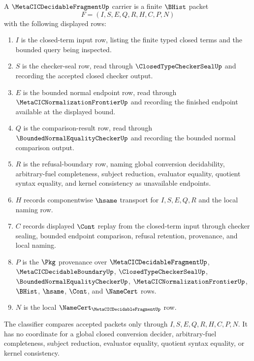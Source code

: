 \begin{definition}
\label{def:metacic-decidable-fragment-carrier}
A $\MetaCICDecidableFragmentUp$ carrier is a finite $\BHist$ packet
$$
F=(I,S,E,Q,R,H,C,P,N)
$$
with the following displayed rows:
\begin{enumerate}
\item $I$ is the closed-term input row, listing the finite typed closed terms and the bounded query being inspected.
\item $S$ is the checker-seal row, read through $\ClosedTypeCheckerSealUp$ and recording the accepted closed checker output.
\item $E$ is the bounded normal endpoint row, read through $\MetaCICNormalizationFrontierUp$ and recording the finished endpoint available at the displayed bound.
\item $Q$ is the comparison-result row, read through $\BoundedNormalEqualityCheckerUp$ and recording the bounded normal comparison output.
\item $R$ is the refusal-boundary row, naming global conversion decidability, arbitrary-fuel completeness, subject reduction, evaluator equality, quotient syntax equality, and kernel consistency as unavailable endpoints.
\item $H$ records componentwise $\hsame$ transport for $I,S,E,Q,R$ and the local naming row.
\item $C$ records displayed $\Cont$ replay from the closed-term input through checker sealing, bounded endpoint comparison, refusal retention, provenance, and local naming.
\item $P$ is the $\Pkg$ provenance over $\MetaCICDecidableFragmentUp$, $\MetaCICDecidableBoundaryUp$, $\ClosedTypeCheckerSealUp$, $\BoundedNormalEqualityCheckerUp$, $\MetaCICNormalizationFrontierUp$, $\BHist$, $\hsame$, $\Cont$, and $\NameCert$ rows.
\item $N$ is the local $\NameCert_{\MetaCICDecidableFragmentUp}$ row.
\end{enumerate}
The classifier compares accepted packets only through $I,S,E,Q,R,H,C,P,N$. It has no coordinate for a global closed conversion decider, arbitrary-fuel completeness, subject reduction, evaluator equality, quotient syntax equality, or kernel consistency.
\end{definition}

